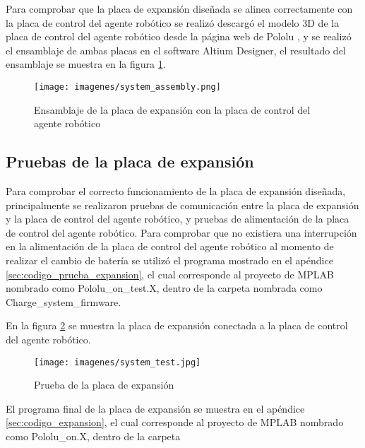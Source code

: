 Para comprobar que la placa de expansión diseñada se alinea correctamente
con la placa de control del agente robótico se realizó descargó el modelo
3D de la placa de control del agente robótico desde la página web de Pololu
\cite{noauthor_pololu_nodate}, y se realizó el ensamblaje de ambas placas
en el software Altium Designer, el resultado del ensamblaje se muestra en
la figura \ref{fig:expansion_board_assembly}.

\begin{figure}[H]
    \centering
    \texttt{[image: imagenes/system\_assembly.png]}
    \caption{Ensamblaje de la placa de expansión con la placa de control del agente robótico}
    \label{fig:expansion_board_assembly}
\end{figure}

\subsection{Pruebas de la placa de expansión}

Para comprobar el correcto funcionamiento de la placa de expansión diseñada,
principalmente se realizaron pruebas de comunicación entre la placa de expansión
y la placa de control del agente robótico, y pruebas de alimentación de la placa
de control del agente robótico. Para comprobar que no existiera una interrupción
en la alimentación de la placa de control del agente robótico al momento de 
realizar el cambio de batería se utilizó el programa mostrado en el apéndice
\ref{sec:codigo_prueba_expansion}, el cual corresponde al proyecto de MPLAB
nombrado como Pololu\_on\_test.X, dentro de la carpeta nombrada como Charge\_system\_firmware.

En la figura \ref{fig:expansion_board_test} se muestra la placa de expansión
conectada a la placa de control del agente robótico.

\begin{figure}[H]
    \centering
    \texttt{[image: imagenes/system\_test.jpg]}
    \caption{Prueba de la placa de expansión}
    \label{fig:expansion_board_test}
\end{figure}

El programa final de la placa de expansión se muestra en el apéndice \ref{sec:codigo_expansion},
el cual corresponde al proyecto de MPLAB nombrado como Pololu\_on.X, dentro de la carpeta

